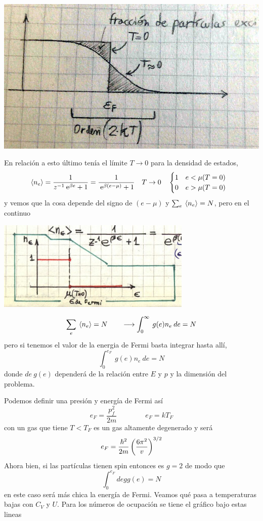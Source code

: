 \documentclass[10pt,oneside]{CBFT_book}
\begin{document}
\begin{itemize}
 
 \includegraphics[scale=0.4]{images/1625624063.jpg}
 
\end{itemize}

En relación a esto último tenía el límite $ T \to 0 $ para la densidad de estados,
\[
	\:\left\langle n_e \right\rangle = \frac{ 1 }{ z^{-1}\:\mathrm{e}^{\beta e} + 1 } = 
	\frac{ 1 }{ \:\mathrm{e}^{\beta (e-\mu)} + 1 } \quad T \to 0 \quad 
	\begin{cases}
		1 \quad e < \mu (T=0) \\
		0 \quad e > \mu (T=0) 
	\end{cases}
\]
y vemos que la cosa depende del signo de $(e - \mu)$ y  $ \sum_e \:\left\langle n_e \right\rangle = N $, pero
en el continuo

\includegraphics[scale=0.5]{images/1606329575.jpg}

\[
	 \sum_e \:\left\langle n_e \right\rangle = N \qquad \longrightarrow \int_0^\infty \: g(e) n_e \: de = N
\]
pero si tenemos el valor de la energia de Fermi basta integrar hasta allí,
\[
	\int_0^{e_F} \: g(e) n_e \: de = N
\]
donde $de \: g(e)$ dependerá de la relación entre $E$ y $p$ y la dimensión del problema.

Podemos definir una presión y energía de Fermi así
\[
	e_F = \frac{p_f^2}{2m} \qquad \qquad e_F = k T_F
\]
con un gas que tiene $ T < T_F $ es un gas altamente degenerado y será
\[
	e_F = \frac{ \hbar^2 }{ 2 m } \left( \frac{  6 \pi^2  }{  v  } \right)^{3/2}
\]
Ahora bien, si las partículas tienen spin entonces es $g=2$ de modo que
\[
	\int_0^{e_F} de g g(e) = N
\]
en este caso será más chica la energía de Fermi. 
Veamos qué pasa a temperaturas bajas con $C_V$ y $U$.
Para los números de ocupación se tiene el gráfico bajo estas lineas
\end{document}
